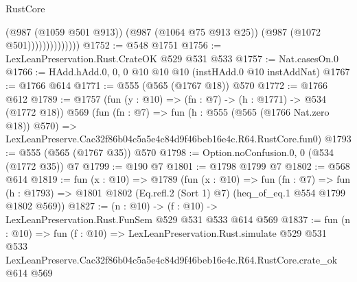 \begin{lexlean}{RustCore}
\begin{coremodule}
                            (@987 (@1059 @501 @913))
                            (@987 (@1064 @75 @913 @25))
                            (@987 (@1072 @501))))))))))))))
@1752 := @548 @1751
@1756 := LexLeanPreservation.Rust.CrateOK @529 @531 @533
@1757 := Nat.casesOn.{0}
@1766 := HAdd.hAdd.{0, 0, 0} @10 @10 @10 (instHAdd.{0} @10 instAddNat)
@1767 := @1766 @614
@1771 := @555 (@565 (@1767 @18)) @570
@1772 := @1766 @612
@1789 := @1757
    (fun (y : @10) => (fn : @7) -> (h : @1771) -> @534 (@1772 @18))
    @569
    (fun (fn : @7) =>
    fun (h : @555 (@565 (@1766 Nat.zero @18)) @570) =>
    LexLeanPreserve.Cac32f86b04c5a5e4c84d9f46beb16e4c.R64.RustCore.fun0)
@1793 := @555 (@565 (@1767 @35)) @570
@1798 := Option.noConfusion.{0, 0} (@534 (@1772 @35)) @7
@1799 := @190 @7
@1801 := @1798 @1799 @7
@1802 := @568 @614
@1819 := fun (x : @10) =>
  @1789
    (fun (x : @10) =>
    fun (fn : @7) =>
    fun (h : @1793) => @1801 @1802 (Eq.refl.{2} (Sort 1) @7) (heq_of_eq.{1} @554 @1799 @1802 @569))
@1827 := (n : @10) -> (f : @10) -> LexLeanPreservation.Rust.FunSem @529 @531 @533 @614 @569
@1837 := fun (n : @10) =>
  fun (f : @10) =>
  LexLeanPreservation.Rust.simulate
    @529
    @531
    @533
    LexLeanPreserve.Cac32f86b04c5a5e4c84d9f46beb16e4c.R64.RustCore.crate_ok
    @614
    @569
\end{coremodule}
\end{lexlean}
